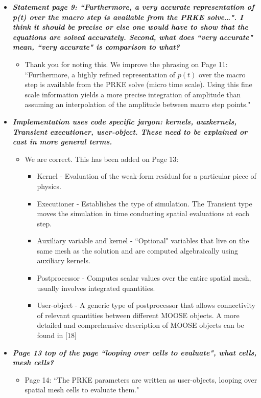 \documentclass{elsarticle}
\newcommand{\done}{\checkmark}
\newcommand{\easy}[1]{\textbf{\textit{#1}}}
\newcommand{\medm}[1]{\textbf{\textit{#1}}}
\begin{document}
\begin{itemize}
\item[\done] \medm{ Statement page 9: ``Furthermore, a very accurate representation of p(t) over the macro step is available from the PRKE solve…". I think it should be precise or else one would have to show that the equations are solved accurately. Second, what does ``very accurate" mean, ``very accurate" is comparison to what? }
\begin{itemize}
\item Thank you for noting this. We improve the phrasing on Page 11: ``Furthermore, a highly refined representation of $p(t)$ over the macro step is available from the PRKE solve (micro time scale). Using this fine scale information yields a more precise integration of amplitude than assuming an interpolation of the amplitude between macro step points."
\end{itemize}

\item[\done] \medm{ Implementation uses code specific jargon: kernels, auxkernels, Transient executioner, user-object. These need to be explained or cast in more general terms. }
\begin{itemize}
\item We are correct. This has been added on Page 13:
\begin{itemize}
\item Kernel - Evaluation of the weak-form residual for a particular piece of physics.
\item Executioner - Establishes the type of simulation. The Transient type moves the simulation in time conducting spatial evaluations at each step.
\item Auxiliary variable and kernel - ``Optional" variables that live on the same mesh as the solution and are computed algebraically using auxiliary kernels. 
\item Postprocessor - Computes scalar values over the entire spatial mesh, usually involves integrated quantities.
\item User-object - A generic type of postprocessor that allows connectivity of relevant quantities between different MOOSE objects.
A more detailed and comprehensive description of MOOSE objects can be found in [18]
\end{itemize}
\end{itemize}

\item[\done] \easy{ Page 13 top of the page ``looping over cells to evaluate", what cells, mesh cells? }
\begin{itemize}
\item Page 14: ``The PRKE parameters are written as user-objects, looping over spatial mesh cells to evaluate them."
\end{itemize}


\end{itemize}
\end{document}
